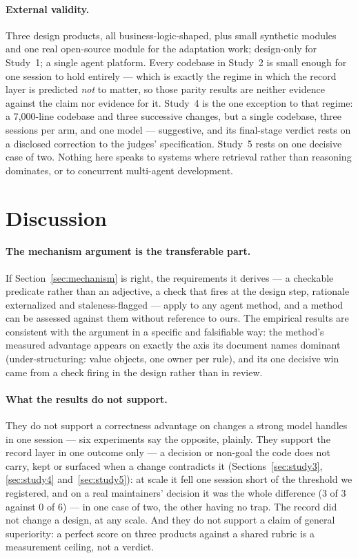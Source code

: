 \documentclass[11pt]{article}
\begin{document}
\paragraph{External validity.} Three design products, all business-logic-shaped, plus small synthetic modules and one real open-source module for the adaptation work; design-only for Study~1; a single agent platform. Every codebase in Study~2 is small enough for one session to hold entirely --- which is exactly the regime in which the record layer is predicted \emph{not} to matter, so those parity results are neither evidence against the claim nor evidence for it. Study~4 is the one exception to that regime: a 7,000-line codebase and three successive changes, but a single codebase, three sessions per arm, and one model --- suggestive, and its final-stage verdict rests on a disclosed correction to the judges' specification. Study~5 rests on one decisive case of two. Nothing here speaks to systems where retrieval rather than reasoning dominates, or to concurrent multi-agent development.

\section{Discussion}

\paragraph{The mechanism argument is the transferable part.} If Section~\ref{sec:mechanism} is right, the requirements it derives --- a checkable predicate rather than an adjective, a check that fires at the design step, rationale externalized and staleness-flagged --- apply to any agent method, and a method can be assessed against them without reference to ours. The empirical results are consistent with the argument in a specific and falsifiable way: the method's measured advantage appears on exactly the axis its document names dominant (under-structuring: value objects, one owner per rule), and its one decisive win came from a check firing in the design rather than in review.

\paragraph{What the results do not support.} They do not support a correctness advantage on changes a strong model handles in one session --- six experiments say the opposite, plainly. They support the record layer in one outcome only --- a decision or non-goal the code does not carry, kept or surfaced when a change contradicts it (Sections~\ref{sec:study3}, \ref{sec:study4} and~\ref{sec:study5}): at scale it fell one session short of the threshold we registered, and on a real maintainers' decision it was the whole difference (3 of 3 against 0 of 6) --- in one case of two, the other having no trap. The record did not change a design, at any scale. And they do not support a claim of general superiority: a perfect score on three products against a shared rubric is a measurement ceiling, not a verdict.
\end{document}
